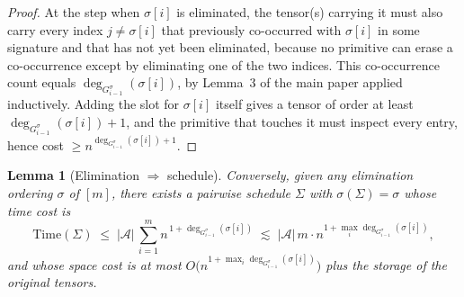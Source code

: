 \documentclass[11pt]{article}
\newcommand{\calA}{\mathcal{A}}
\theoremstyle{plain}
\newtheorem{lemma}[theorem]{Lemma}
\theoremstyle{definition}
\begin{document}
\begin{proof}
At the step when $\sigma[i]$ is eliminated, the tensor(s) carrying it must
also carry every index $j\neq\sigma[i]$ that previously co-occurred with
$\sigma[i]$ in some signature and that has not yet been eliminated, because
no primitive can erase a co-occurrence except by eliminating one of the
two indices.  This co-occurrence count equals
$\deg_{G^\sigma_{i-1}}(\sigma[i])$, by Lemma~3 of the main paper applied
inductively.  Adding the slot for $\sigma[i]$ itself gives a tensor of
order at least $\deg_{G^\sigma_{i-1}}(\sigma[i])+1$, and the primitive
that touches it must inspect every entry, hence cost
$\geq n^{\deg_{G^\sigma_{i-1}}(\sigma[i])+1}$.
\end{proof}

\begin{lemma}[Elimination $\Rightarrow$ schedule]
\label{lem:elim-to-schedule}
Conversely, given any elimination ordering $\sigma$ of $[m]$, there exists a
pairwise schedule $\Sigma$ with $\sigma(\Sigma)=\sigma$ whose time cost is
\[
   \mathrm{Time}(\Sigma) \;\leq\;
   |\calA|\,\sum_{i=1}^{m} n^{\,1+\deg_{G^\sigma_{i-1}}(\sigma[i])}
   \;\lesssim\;
   |\calA|\,m\cdot n^{1+\max_i \deg_{G^\sigma_{i-1}}(\sigma[i])},
\]
and whose space cost is at most
$O\bigl(n^{1+\max_i \deg_{G^\sigma_{i-1}}(\sigma[i])}\bigr)$ plus
the storage of the original tensors.
\end{lemma}
\end{document}
